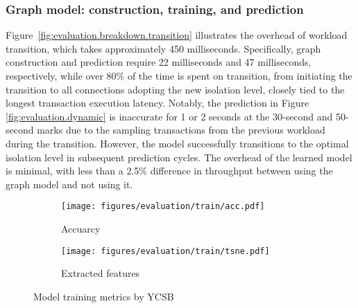 \subsubsection{Graph model: construction, training, and prediction}

Figure~\ref{fig:evaluation.breakdown.transition} illustrates the overhead of workload transition, which takes approximately 450 milliseconds.
Specifically, graph construction and prediction require 22 milliseconds and 47 milliseconds, respectively, while over 80\% of the time is spent on transition, from initiating the transition to all connections adopting the new isolation level, closely tied to the longest transaction execution latency.
Notably, the prediction in Figure \ref{fig:evaluation.dynamic} is inaccurate for 1 or 2 seconds at the 30-second and 50-second marks due to the sampling transactions from the previous workload during the transition. However, the model successfully transitions to the optimal isolation level in subsequent prediction cycles. The overhead of the learned model is minimal, with less than a 2.5\% difference in throughput between using the graph model and not using it.

\begin{figure}[t]
    \centering
    \begin{minipage}{0.95\linewidth}
        \centering
        \begin{subfigure}{0.48\linewidth}
            \texttt{[image: figures/evaluation/train/acc.pdf]}
            \vspace{-6mm}
            \caption{Accuarcy}
            \label{fig:evaluation.train.acc}
        \end{subfigure}
        \begin{subfigure}{0.48\linewidth}
        \texttt{[image: figures/evaluation/train/tsne.pdf]}
            \vspace{-6mm}
            \caption{Extracted features}
            \label{fig:evaluation.train.cluster}
        \end{subfigure}
    \end{minipage}
    \vspace{-4mm}
    \caption{Model training metrics by YCSB}
    \label{fig:evaluation.train}
    \vspace{-4mm}
\end{figure}

